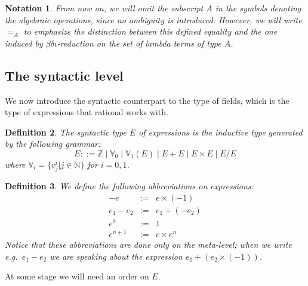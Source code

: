 \documentclass{article}
\newtheorem{definition}{Definition}[section]
\newtheorem{notation}[definition]{Notation}
\newcommand{\alt}{\mathrel{|}}
\newcommand{\Z}{{\mathbb Z}}
\newcommand{\V}{{\mathbb V}}
\newcommand{\tacticname}[1]{\textsf{#1}}
\newcommand{\rational}{\tacticname{rational}}
\newcommand{\nat}{{\mathbb N}}
\begin{document}
\begin{notation} From now on, we will omit the subscript $A$ in the
symbols denoting the algebraic operations, since no ambiguity is introduced.
However, we will write $=_A$ to emphasize the distinction between this
defined equality and the one induced by $\beta\delta\iota$-reduction on
the set of lambda terms of type $A$.
\end{notation}

\subsection{The syntactic level}\label{expressions}

We now introduce the syntactic counterpart to the type of fields, which
is the type of expressions that {\rational} works with.

\begin{definition}\label{defn:expressions}
The syntactic type $E$ of expressions is the inductive type generated by the
following grammar:
\[E ::= \Z \alt \V_0 \alt \V_1(E) \alt E+E \alt E\times E \alt E/E\]
where $\V_i=\{v^i_j|j\in\nat\}$ for $i=0,1$.
\end{definition}

\begin{definition}\label{expr:abbr}
We define the following \emph{abbreviations} on expressions:
\begin{eqnarray}
\label{expr:inv} -e & := & e\times(-1)\\
\label{expr:minus} e_1-e_2 & := & e_1+(-e_2)\\
\label{expr:exp:zero} e^0 & := & 1\\
\label{expr:exp:suc} e^{n+1} & := & e\times e^n
\end{eqnarray}
Notice that these abbreviations are done only on the meta-level; when
we write e.g.\ $e_1-e_2$ we are speaking about the expression
$e_1+(e_2\times(-1))$.
\end{definition}

At some stage we will need an order on $E$.
\end{document}
